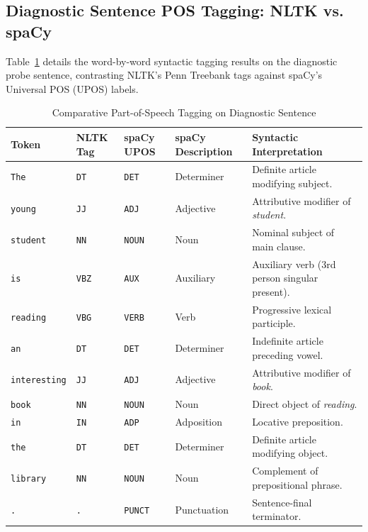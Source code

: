 \documentclass[12pt,a4paper]{report}
\begin{document}
\subsection{Diagnostic Sentence POS Tagging: NLTK vs. spaCy}
Table~\ref{tab:exp5_pos_sent_compare} details the word-by-word syntactic tagging results on the diagnostic probe sentence, contrasting NLTK's Penn Treebank tags against spaCy's Universal POS (UPOS) labels.
\begin{table}[H]
\centering
\small
\caption{Comparative Part-of-Speech Tagging on Diagnostic Sentence}
\label{tab:exp5_pos_sent_compare}
\begin{tabularx}{\textwidth}{lllp{4cm}X}
\toprule
\textbf{Token} & \textbf{NLTK Tag} & \textbf{spaCy UPOS} & \textbf{spaCy Description} & \textbf{Syntactic Interpretation} \\
\midrule
\texttt{The} & \texttt{DT} & \texttt{DET} & Determiner & Definite article modifying subject. \\
\texttt{young} & \texttt{JJ} & \texttt{ADJ} & Adjective & Attributive modifier of \textit{student}. \\
\texttt{student} & \texttt{NN} & \texttt{NOUN} & Noun & Nominal subject of main clause. \\
\texttt{is} & \texttt{VBZ} & \texttt{AUX} & Auxiliary & Auxiliary verb (3rd person singular present). \\
\texttt{reading} & \texttt{VBG} & \texttt{VERB} & Verb & Progressive lexical participle. \\
\texttt{an} & \texttt{DT} & \texttt{DET} & Determiner & Indefinite article preceding vowel. \\
\texttt{interesting} & \texttt{JJ} & \texttt{ADJ} & Adjective & Attributive modifier of \textit{book}. \\
\texttt{book} & \texttt{NN} & \texttt{NOUN} & Noun & Direct object of \textit{reading}. \\
\texttt{in} & \texttt{IN} & \texttt{ADP} & Adposition & Locative preposition. \\
\texttt{the} & \texttt{DT} & \texttt{DET} & Determiner & Definite article modifying object. \\
\texttt{library} & \texttt{NN} & \texttt{NOUN} & Noun & Complement of prepositional phrase. \\
\texttt{.} & \texttt{.} & \texttt{PUNCT} & Punctuation & Sentence-final terminator. \\
\bottomrule
\end{tabularx}
\end{table}
\end{document}
